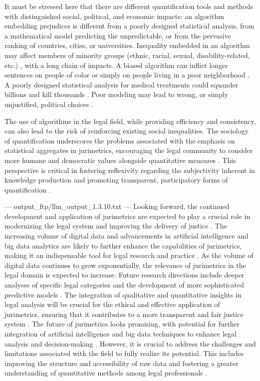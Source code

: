 It must be stressed here that there are different quantification tools and methods with distinguished social, political, and economic impacts: an algorithm embedding prejudices is different from a poorly designed statistical analysis, from a mathematical model predicting the unpredictable, or from the pervasive ranking of countries, cities, or universities. Inequality embedded in an algorithm may affect members of minority groups (ethnic, racial, sexual, disability-related, etc.) \cite{danaher2017}, with a long chain of impacts. A biased algorithm can inflict longer sentences on people of color or simply on people living in a poor neighborhood \cite{o'neil2016, muller2018}. A poorly designed statistical analysis for medical treatments could squander billions and kill thousands \cite{harris2017}. Poor modeling may lead to wrong, or simply unjustified, political choices \cite{saltelli2019, saltelli2020a, saltelli2020b}.

The use of algorithms in the legal field, while providing efficiency and consistency, can also lead to the risk of reinforcing existing social inequalities. The sociology of quantification underscores the problems associated with the emphasis on statistical aggregates in jurimetrics, encouraging the legal community to consider more humane and democratic values alongside quantitative measures \cite{10.5040/9781350220645,10.1057/s41599-020-0396-5,di_fiore_et+al_challengequantificationinterdisciplinaryreading_2022}. This perspective is critical in fostering reflexivity regarding the subjectivity inherent in knowledge production and promoting transparent, participatory forms of quantification \cite{10.1007/s11186-021-09453-1,loevinger1959}.


---
output_ftp/llm_output_1.3.10.txt
---
Looking forward, the continued development and application of jurimetrics are expected to play a crucial role in modernizing the legal system and improving the delivery of justice \cite{silva2023role}. The increasing volume of digital data and advancements in artificial intelligence and big data analytics are likely to further enhance the capabilities of jurimetrics, making it an indispensable tool for legal research and practice \cite{silva2023role}. As the volume of digital data continues to grow exponentially, the relevance of jurimetrics in the legal domain is expected to increase. Future research directions include deeper analyses of specific legal categories and the development of more sophisticated predictive models \cite{silva2023role}. The integration of qualitative and quantitative insights in legal analysis will be crucial for the ethical and effective application of jurimetrics, ensuring that it contributes to a more transparent and fair justice system \cite{silva2023role, zabala2019d}. The future of jurimetrics looks promising, with potential for further integration of artificial intelligence and big data techniques to enhance legal analysis and decision-making \cite{silva2023role}. However, it is crucial to address the challenges and limitations associated with the field to fully realize its potential. This includes improving the structure and accessibility of raw data and fostering a greater understanding of quantitative methods among legal professionals \cite{l2010de}.


